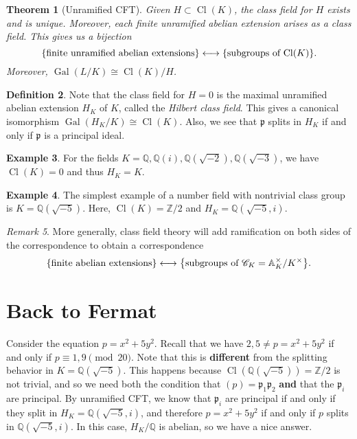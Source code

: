 \documentclass[leqno, openany]{memoir}
\newtheorem{thm}{Theorem}[section]
\theoremstyle{definition}
\newtheorem{defn}[thm]{Definition}
\newtheorem{exm}[thm]{Example}
\theoremstyle{remark}
\newtheorem{rmk}[thm]{Remark}
\theoremstyle{plain}
\theoremstyle{definition}
\theoremstyle{remark}
\newcommand{\A}{\mathbb{A}}
\newcommand{\Z}{\mathbb{Z}}
\newcommand{\Q}{\mathbb{Q}}
\newcommand{\mf}[1]{\mathfrak{#1}}
\newcommand{\mscr}[1]{\mathscr{#1}}
\DeclareMathOperator{\Gal}{Gal}
\DeclareMathOperator{\Cl}{Cl}
\begin{document}
\begin{thm}[Unramified CFT]
    Given $H \subset \Cl(K)$, the class field for $H$ exists and is unique. Moreover, each finite unramified abelian extension arises as a class field. This gives us a bijection
    \[ \qty{\text{finite unramified abelian extensions}} \longleftrightarrow \qty{\text{subgroups of $\Cl(K)$}}. \]
    Moreover, $\Gal(L/K) \cong \Cl(K) / H$.
\end{thm}

\begin{defn}
    Note that the class field for $H = 0$ is the maximal unramified abelian extension $H_K$ of $K$, called the \textit{Hilbert class field}. This gives a canonical isomorphism $\Gal(H_K/K) \cong \Cl(K)$. Also, we see that $\mf{p}$ splits in $H_K$ if and only if $\mf{p}$ is a principal ideal.
\end{defn}

\begin{exm}
    For the fields $K = \Q, \Q(i), \Q(\sqrt{-2}), \Q(\sqrt{-3})$, we have $\Cl(K) = 0$ and thus $H_K = K$.
\end{exm}

\begin{exm}
    The simplest example of a number field with nontrivial class group is $K = \Q(\sqrt{-5})$. Here, $\Cl(K) = \Z/2$ and $H_K = \Q(\sqrt{-5}, i)$.
\end{exm}

\begin{rmk}
    More generally, class field theory will add ramification on both sides of the correspondence to obtain a correspondence
    \[ \qty{\text{finite abelian extensions}} \longleftrightarrow \qty{\text{subgroups of $\mscr{C}_K = \A_K^{\times}/K^{\times}$}}. \]
\end{rmk}

\section{Back to Fermat}%
\label{sec:back_to_fermat}

Consider the equation $p = x^2 + 5y^2$. Recall that we have $2,5 \neq p = x^2 + 5y^2$ if and only if $p \equiv 1,9 \pmod 20$. Note that this is \textbf{different} from the splitting behavior in $K = \Q(\sqrt{-5})$. This happens because $\Cl(\Q(\sqrt{-5})) = \Z/2$ is not trivial, and so we need both the condition that $(p) = \mf{p}_1 \mf{p}_2$ \textbf{and} that the $\mf{p} _i$ are principal. By unramified CFT, we know that $\mf{p}_i$ are principal if and only if they split in $H_K = \Q(\sqrt{-5}, i)$, and therefore $p = x^2 + 5y^2$ if and only if $p$ splits in $\Q(\sqrt{-5}, i)$. In this case, $H_K/\Q$ is abelian, so we have a nice answer.
\end{document}
